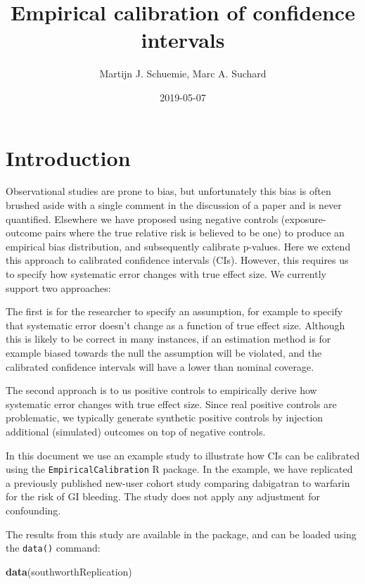 \documentclass[]{article}
\title{Empirical calibration of confidence intervals}
\author{Martijn J. Schuemie, Marc A. Suchard}
\date{2019-05-07}
\newenvironment{Shaded}{\begin{snugshade}}{\end{snugshade}}
\newcommand{\KeywordTok}[1]{\textcolor[rgb]{0.13,0.29,0.53}{\textbf{#1}}}
\newcommand{\NormalTok}[1]{#1}
\begin{document}
\maketitle

{
\setcounter{tocdepth}{2}
\tableofcontents
}
\hypertarget{introduction}{%
\section{Introduction}\label{introduction}}

Observational studies are prone to bias, but unfortunately this bias is
often brushed aside with a single comment in the discussion of a paper
and is never quantified. Elsewhere we have proposed using negative
controls (exposure-outcome pairs where the true relative risk is
believed to be one) to produce an empirical bias distribution, and
subsequently calibrate p-values. Here we extend this approach to
calibrated confidence intervals (CIs). However, this requires us to
specify how systematic error changes with true effect size. We currently
support two approaches:

The first is for the researcher to specify an assumption, for example to
specify that systematic error doesn't change as a function of true
effect size. Although this is likely to be correct in many instances, if
an estimation method is for example biased towards the null the
assumption will be violated, and the calibrated confidence intervals
will have a lower than nominal coverage.

The second approach is to us positive controls to empirically derive how
systematic error changes with true effect size. Since real positive
controls are problematic, we typically generate synthetic positive
controls by injection additional (simulated) outcomes on top of negative
controls.

In this document we use an example study to illustrate how CIs can be
calibrated using the \texttt{EmpiricalCalibration} R package. In the
example, we have replicated a previously published new-user cohort study
comparing dabigatran to warfarin for the risk of GI bleeding. The study
does not apply any adjustment for confounding.

The results from this study are available in the package, and can be
loaded using the \texttt{data()} command:

\begin{Shaded}
\begin{Highlighting}[]
\KeywordTok{data}\NormalTok{(southworthReplication)}
\end{Highlighting}
\end{Shaded}
\end{document}
